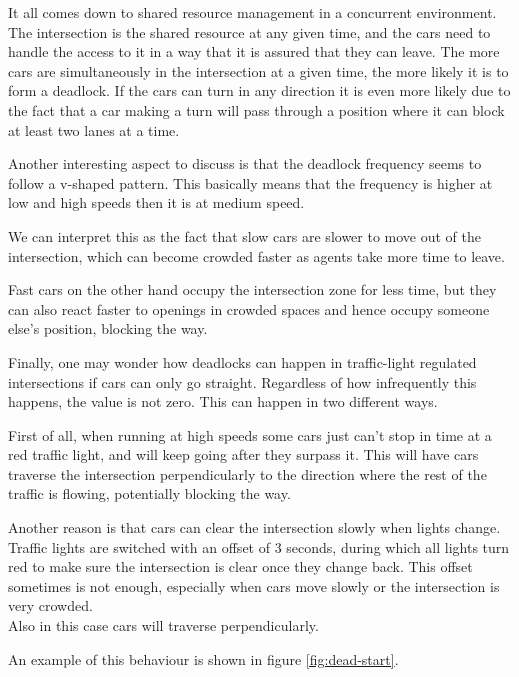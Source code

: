It all comes down to shared resource management in a concurrent environment.
The intersection is the shared resource at any given time, and the cars need to handle the access to it in a way that it is assured that they can leave.
The more cars are simultaneously in the intersection at a given time, the more likely it is to form a deadlock.
If the cars can turn in any direction it is even more likely due to the fact that a car making a turn will pass through a position where it can block at least two lanes at a time.
\newline

Another interesting aspect to discuss is that the deadlock frequency seems to follow a v-shaped pattern.
This basically means that the frequency is higher at low and high speeds then it is at medium speed.

We can interpret this as the fact that slow cars are slower to move out of the intersection, which can become crowded faster as agents take more time to leave.

Fast cars on the other hand occupy the intersection zone for less time, but they can also react faster to openings in crowded spaces and hence occupy someone else's position, blocking the way. 
\newline

Finally, one may wonder how deadlocks can happen in traffic-light regulated intersections if cars can only go straight.
Regardless of how infrequently this happens, the value is not zero.
This can happen in two different ways.

First of all, when running at high speeds some cars just can't stop in time at a red traffic light, and will keep going after they surpass it.
This will have cars traverse the intersection perpendicularly to the direction where the rest of the traffic is flowing, potentially blocking the way.

Another reason is that cars can clear the intersection slowly when lights change.
Traffic lights are switched with an offset of 3 seconds, during which all lights turn red to make sure the intersection is clear once they change back. 
This offset sometimes is not enough, especially when cars move slowly or the intersection is very crowded.\\
Also in this case cars will traverse perpendicularly.

An example of this behaviour is shown in figure \ref{fig:dead-start}.

